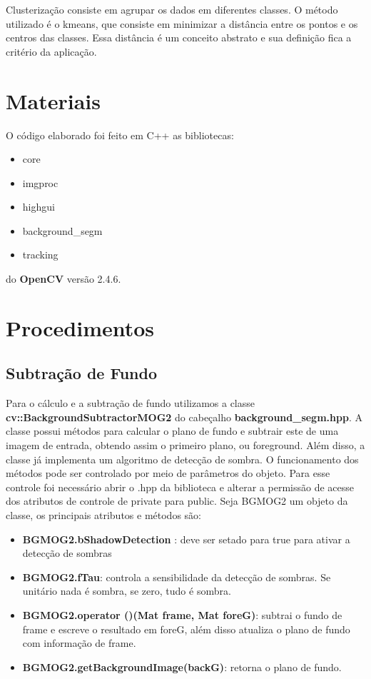 \documentclass[journal]{IEEEtran}
\begin{document}
    Clusterização consiste em agrupar os dados em diferentes classes. 
O método utilizado é o kmeans, que consiste em minimizar a 
distância entre os pontos e os centros das classes. Essa distância é 
um conceito abstrato e sua definição fica a critério da aplicação.
  
  \newpage
\section{Materiais}
O código elaborado foi feito em C++ as bibliotecas:
\begin{itemize}
    \item core
    \item imgproc
    \item highgui
    \item background\_segm
    \item tracking
\end{itemize}
do \textbf{OpenCV} versão 2.4.6.


\section{Procedimentos}
\subsection{Subtração de Fundo}
Para o cálculo e a subtração de fundo utilizamos a 
classe \textbf{cv::BackgroundSubtractorMOG2} do cabeçalho
\textbf{background\_segm.hpp}. A classe possui métodos para calcular 
o plano de fundo e subtrair este de uma imagem de entrada, obtendo 
assim o primeiro plano, ou foreground. Além disso, a classe já 
implementa um algoritmo de detecção de sombra. O funcionamento dos 
métodos pode ser controlado por meio de parâmetros do objeto. Para 
esse controle foi necessário abrir o .hpp da biblioteca e alterar a 
permissão de acesse dos atributos de controle de private para public.
Seja BGMOG2 um objeto da classe, os principais atributos e métodos 
são:
\begin{itemize}
      \item \textbf{BGMOG2.bShadowDetection } :
      deve ser setado para true para ativar a detecção de sombras
      \item \textbf{BGMOG2.fTau}: controla a 
sensibilidade da detecção de sombras. Se unitário nada é sombra, se 
zero, tudo é sombra. 
      \item \textbf{BGMOG2.operator ()(Mat frame, Mat foreG)}: 
subtrai o fundo de frame e escreve o resultado em foreG, além disso 
atualiza o plano de fundo com informação de frame.
      \item \textbf{BGMOG2.getBackgroundImage(backG)}: retorna o 
plano de fundo.
\end{itemize}
\end{document}
